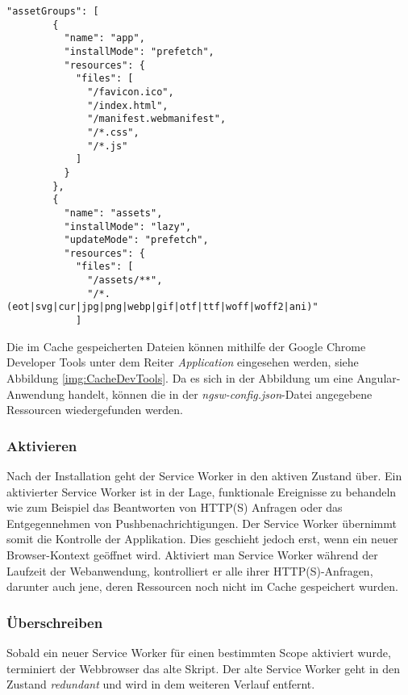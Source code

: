 \begin{lstlisting}[caption={Angular \textit{ngsw-config.json}-Datei zur Angabe der Ressourcen, die durch den Service Worker in den Cache gespeichert werden sollen}, label=lst:ngswConfig, float=!htb ]
    "assetGroups": [
        {
          "name": "app",
          "installMode": "prefetch",
          "resources": {
            "files": [
              "/favicon.ico",
              "/index.html",
              "/manifest.webmanifest",
              "/*.css",
              "/*.js"
            ]
          }
        },
        {
          "name": "assets",
          "installMode": "lazy",
          "updateMode": "prefetch",
          "resources": {
            "files": [
              "/assets/**",
              "/*.(eot|svg|cur|jpg|png|webp|gif|otf|ttf|woff|woff2|ani)"
            ] 
\end{lstlisting}


Die im Cache gespeicherten Dateien können mithilfe der Google Chrome Developer Tools unter dem Reiter \textit{Application} eingesehen werden, siehe Abbildung \ref{img:CacheDevTools}. Da es sich in der Abbildung um eine Angular-Anwendung handelt, können die in der \textit{ngsw-config.json}-Datei angegebene Ressourcen wiedergefunden werden.   


\subsubsection{Aktivieren}

Nach der Installation geht der Service Worker in den aktiven Zustand über. Ein aktivierter Service Worker ist in der Lage, funktionale Ereignisse zu behandeln wie zum Beispiel das Beantworten von HTTP(S) Anfragen oder das Entgegennehmen von Pushbenachrichtigungen. 
Der Service Worker übernimmt somit die Kontrolle der Applikation. Dies geschieht jedoch erst, wenn ein neuer Browser-Kontext geöffnet wird. Aktiviert man Service Worker während der Laufzeit der Webanwendung, kontrolliert er alle ihrer HTTP(S)-Anfragen, darunter auch jene, deren Ressourcen noch nicht im Cache gespeichert wurden.

\subsubsection{Überschreiben}

Sobald ein neuer Service Worker für einen bestimmten Scope aktiviert wurde, terminiert der Webbrowser das alte Skript. Der alte Service Worker geht in den Zustand \textit{redundant} und wird in dem weiteren Verlauf entfernt. 

